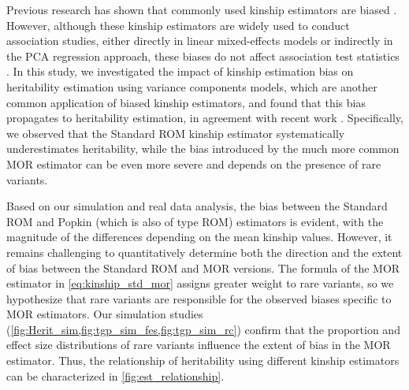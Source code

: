\documentclass[11pt]{article}
\begin{document}
Previous research has shown that commonly used kinship estimators are biased \citep{ochoa_estimating_2021}. However, although these kinship estimators are widely used to conduct association studies, either directly in linear mixed-effects models or indirectly in the PCA regression approach, these biases do not affect association test statistics \citep{hou2023genetic}. In this study, we investigated the impact of kinship estimation bias on heritability estimation using variance components models, which are another common application of biased kinship estimators, and found that this bias propagates to heritability estimation, in agreement with recent work \citep{chen2022kinship}. Specifically, we observed that the Standard ROM kinship estimator systematically underestimates heritability, while the bias introduced by the much more common MOR estimator can be even more severe and depends on the presence of rare variants.






Based on our simulation and real data analysis, the bias between the Standard ROM and Popkin (which is also of type ROM) estimators is evident, with the magnitude of the differences depending on the mean kinship values. However, it remains challenging to quantitatively determine both the direction and the extent of bias between the Standard ROM and MOR versions. The formula of the MOR estimator in \cref{eq:kinship_std_mor} assigns greater weight to rare variants, so we hypothesize that rare variants are responsible for the observed biases specific to MOR estimators. Our simulation studies (\cref{fig:Herit_sim,fig:tgp_sim_fes,fig:tgp_sim_rc}) confirm that the proportion and effect size distributions of rare variants influence the extent of bias in the MOR estimator. Thus, the relationship of heritability using different kinship estimators can be characterized in \cref{fig:est_relationship}.
\end{document}
